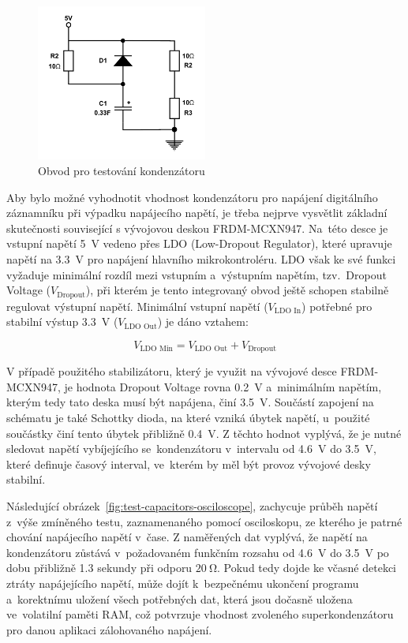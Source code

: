\begin{figure}[h]
    \centering
    \includegraphics[width=0.50\textwidth]{obrazky-figures/test_capacitors.pdf}
    
    \caption{Obvod pro testování kondenzátoru}
    \label{fig:test-capacitors}
\end{figure}

\newpage

Aby bylo možné vyhodnotit vhodnost kondenzátoru pro napájení digitálního záznamníku při výpadku napájecího napětí, je třeba nejprve vysvětlit základní skutečnosti související s vývojovou deskou FRDM-MCXN947. Na~této desce je vstupní napětí \SI{5}{\volt} vedeno přes LDO (Low-Dropout Regulator), které upravuje napětí na \SI{3.3}{\volt} pro napájení hlavního mikrokontroléru. LDO však ke své funkci vyžaduje minimální rozdíl mezi vstupním a~výstupním napětím, tzv.~Dropout Voltage ($V_{\text{Dropout}}$), při kterém je tento integrovaný obvod ještě schopen stabilně regulovat výstupní napětí. Minimální vstupní napětí ($V_{\text{LDO In}}$) potřebné pro stabilní výstup \SI{3.3}{\volt} ($V_{\text{LDO Out}}$) je dáno vztahem:

\[
V_{\text{LDO Min}} = V_{\text{LDO Out}} + V_{\text{Dropout}}
\]

V případě použitého stabilizátoru, který je využit na vývojové desce FRDM-MCXN947, je hodnota Dropout Voltage rovna \SI{0.2}{\volt} a~minimálním napětím, kterým tedy tato deska musí být napájena, činí \SI{3.5}{\volt}. Součástí zapojení na schématu je také Schottky dioda, na které vzniká úbytek napětí, u~použité součástky činí tento úbytek přibližně \SI{0.4}{\volt}. Z těchto hodnot vyplývá, že je nutné sledovat napětí vybíjejícího se~kondenzátoru v~intervalu od \SI{4.6}{\volt} do \SI{3.5}{\volt}, které definuje časový interval, ve~kterém by měl být provoz vývojové desky stabilní.

Následující obrázek~\ref{fig:test-capacitors-osciloscope}, zachycuje průběh napětí z~výše zmíněného testu, zaznamenaného pomocí osciloskopu, ze kterého je patrné chování napájecího napětí v~čase. Z naměřených dat vyplývá, že napětí na kondenzátoru zůstává v~požadovaném funkčním rozsahu od \SI{4.6}{\volt} do \SI{3.5}{\volt} po dobu přibližně 1.3 sekundy při odporu $\SI{20}{\ohm}$. Pokud tedy dojde ke včasné detekci ztráty napájejícího napětí, může dojít k~bezpečnému ukončení programu a~korektnímu uložení všech potřebných dat, která jsou dočasně uložena ve~volatilní paměti RAM, což potvrzuje vhodnost zvoleného superkondenzátoru pro danou aplikaci zálohovaného napájení.


